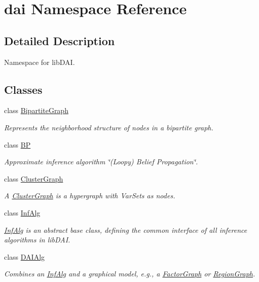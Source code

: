 \hypertarget{namespacedai}{
\section{dai Namespace Reference}
\label{namespacedai}
}


\subsection{Detailed Description}
Namespace for libDAI. 



\subsection*{Classes}
\begin{CompactItemize}
\item 
class \hyperlink{classdai_1_1BipartiteGraph}{BipartiteGraph}
\begin{CompactList}\small\item\em Represents the neighborhood structure of nodes in a bipartite graph. \item\end{CompactList}\item 
class \hyperlink{classdai_1_1BP}{BP}
\begin{CompactList}\small\item\em Approximate inference algorithm \char`\"{}(Loopy) Belief Propagation\char`\"{}. \item\end{CompactList}\item 
class \hyperlink{classdai_1_1ClusterGraph}{ClusterGraph}
\begin{CompactList}\small\item\em A \hyperlink{classdai_1_1ClusterGraph}{ClusterGraph} is a hypergraph with VarSets as nodes. \item\end{CompactList}\item 
class \hyperlink{classdai_1_1InfAlg}{InfAlg}
\begin{CompactList}\small\item\em \hyperlink{classdai_1_1InfAlg}{InfAlg} is an abstract base class, defining the common interface of all inference algorithms in libDAI. \item\end{CompactList}\item 
class \hyperlink{classdai_1_1DAIAlg}{DAIAlg}
\begin{CompactList}\small\item\em Combines an \hyperlink{classdai_1_1InfAlg}{InfAlg} and a graphical model, e.g., a \hyperlink{classdai_1_1FactorGraph}{FactorGraph} or \hyperlink{classdai_1_1RegionGraph}{RegionGraph}. \item\end{CompactList}\item 

\end{CompactItemize}
